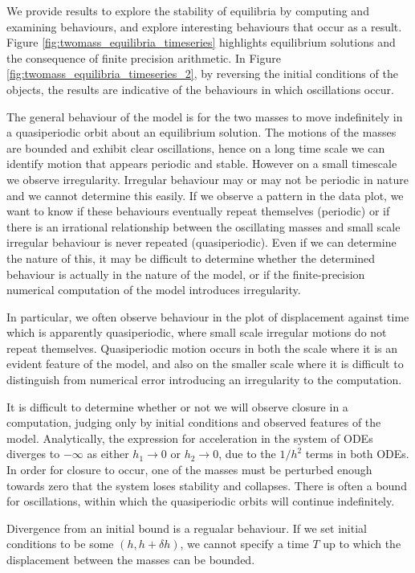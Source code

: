 We provide results to explore the stability of equilibria by computing and examining behaviours, and explore interesting behaviours that occur as a result.
Figure \ref{fig:twomass_equilibria_timeseries} highlights equilibrium solutions and the consequence of finite precision arithmetic.
In Figure \ref{fig:twomass_equilibria_timeseries_2}, by reversing the initial conditions of the objects,
the results are indicative of the behaviours in which oscillations occur.

The general behaviour of the model is for the two masses to move indefinitely in a quasiperiodic orbit about an equilibrium solution.
The motions of the masses are bounded and exhibit clear oscillations,
hence on a long time scale we can identify motion that appears periodic and stable.
However on a small timescale we observe irregularity.
Irregular behaviour may or may not be periodic in nature and we cannot determine this easily.
If we observe a pattern in the data plot, %
we want to know if these behaviours eventually repeat themselves (periodic) or if there is an irrational relationship between the oscillating masses and small scale irregular behaviour is never repeated (quasiperiodic).
Even if we can determine the nature of this,
it may be difficult to determine whether the determined behaviour is actually in the nature of the model,
or if the finite-precision numerical computation of the model introduces irregularity.

In particular, we often observe behaviour in the plot of displacement against time which is apparently quasiperiodic,
where small scale irregular motions do not repeat themselves.
Quasiperiodic motion occurs in both the scale where it is an evident feature of the model,
and also on the smaller scale where it is difficult to distinguish from numerical error introducing an irregularity to the computation.

It is difficult to determine whether or not we will observe closure in a computation,
judging only by initial conditions and observed features of the model.
Analytically, the expression for acceleration in the system of ODEs diverges to $-\infty$ as either \(h_1\rightarrow 0\) or \(h_2 \rightarrow 0\),
due to the \(1/h^2\) terms in both ODEs.
In order for closure to occur,
one of the masses must be perturbed enough towards zero that the system loses stability and collapses.
There is often a bound for oscillations, within which the quasiperiodic orbits will continue indefinitely.

Divergence from an initial bound is a regualar behaviour.
If we set initial conditions to be some \((h,h+\delta h)\),
we cannot specify a time $T$ up to which the displacement between the masses can be bounded.

